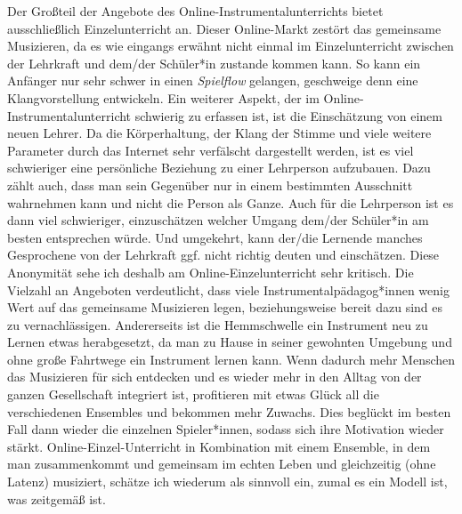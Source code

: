 Der Großteil der Angebote des Online-Instrumentalunterrichts bietet
ausschließlich Einzelunterricht an. Dieser Online-Markt zestört das gemeinsame
Musizieren, da es wie eingangs erwähnt nicht einmal im Einzelunterricht zwischen
der Lehrkraft und dem/der Schüler*in zustande kommen kann. So kann ein Anfänger
nur sehr schwer in einen \emph{Spielflow} gelangen, geschweige denn eine
Klangvorstellung entwickeln. Ein weiterer Aspekt, der im
Online-Instrumentalunterricht schwierig zu erfassen ist, ist die Einschätzung
von einem neuen Lehrer. Da die Körperhaltung, der Klang der Stimme und viele
weitere Parameter durch das Internet sehr verfälscht dargestellt werden, ist es
viel schwieriger eine persönliche Beziehung zu einer Lehrperson aufzubauen. Dazu
zählt auch, dass man sein Gegenüber nur in einem bestimmten Ausschnitt
wahrnehmen kann und nicht die Person als Ganze. Auch für die Lehrperson ist es
dann viel schwieriger, einzuschätzen welcher Umgang dem/der Schüler*in am besten
entsprechen würde. Und umgekehrt, kann der/die Lernende manches Gesprochene von
der Lehrkraft ggf. nicht richtig deuten und einschätzen. Diese Anonymität sehe
ich deshalb am Online-Einzelunterricht sehr kritisch. Die Vielzahl an Angeboten
verdeutlicht, dass viele Instrumentalpädagog*innen wenig Wert auf das gemeinsame
Musizieren legen, beziehungsweise bereit dazu sind es zu vernachlässigen.
Andererseits ist die Hemmschwelle ein Instrument neu zu Lernen etwas
herabgesetzt, da man zu Hause in seiner gewohnten Umgebung und ohne große
Fahrtwege ein Instrument lernen kann. Wenn dadurch mehr Menschen das Musizieren
für sich entdecken und es wieder mehr in den Alltag von der ganzen Gesellschaft
integriert ist, profitieren mit etwas Glück all die verschiedenen Ensembles und
bekommen mehr Zuwachs. Dies beglückt im besten Fall dann wieder die einzelnen
Spieler*innen, sodass sich ihre Motivation wieder stärkt.
Online-Einzel-Unterricht in Kombination mit einem Ensemble, in dem man
zusammenkommt und gemeinsam im echten Leben und gleichzeitig (ohne Latenz)
musiziert, schätze ich wiederum als sinnvoll ein, zumal es ein Modell ist, was
zeitgemäß ist. 

